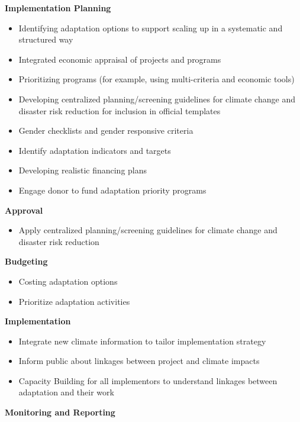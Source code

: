 \documentclass[
]{book}
\providecommand{\tightlist}{%
  \setlength{\itemsep}{0pt}\setlength{\parskip}{0pt}}
\begin{document}
\textbf{Implementation Planning}

\begin{itemize}
\tightlist
\item
  Identifying adaptation options to support scaling up in a systematic and structured way
\item
  Integrated economic appraisal of projects and programs
\item
  Prioritizing programs (for example, using multi-criteria and economic tools)\\
\item
  Developing centralized planning/screening guidelines for climate change and disaster risk reduction for inclusion in official templates\\
\item
  Gender checklists and gender responsive criteria
\item
  Identify adaptation indicators and targets
\item
  Developing realistic financing plans
\item
  Engage donor to fund adaptation priority programs
\end{itemize}

\textbf{Approval}

\begin{itemize}
\tightlist
\item
  Apply centralized planning/screening guidelines for climate change and disaster risk reduction
\end{itemize}

\textbf{Budgeting}

\begin{itemize}
\tightlist
\item
  Costing adaptation options
\item
  Prioritize adaptation activities
\end{itemize}

\textbf{Implementation}

\begin{itemize}
\tightlist
\item
  Integrate new climate information to tailor implementation strategy
\item
  Inform public about linkages between project and climate impacts
\item
  Capacity Building for all implementors to understand linkages between adaptation and their work
\end{itemize}

\textbf{Monitoring and Reporting}
\end{document}
